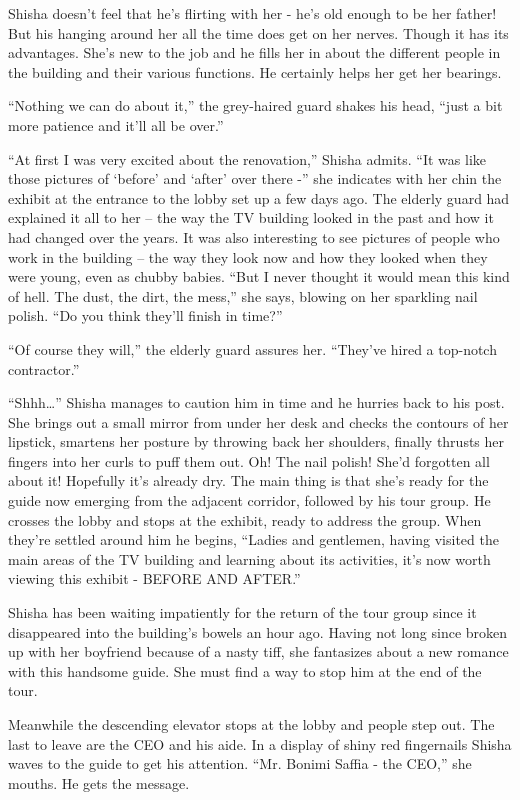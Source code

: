 \documentclass[twoside,11pt]{book}
\begin{document}
Shisha doesn't feel that he's flirting with her - he's old enough to be her father! But his hanging around her all the
time does get on her nerves. Though it has its advantages. She's new to the job and he fills her in
about the different people in the building and their various functions. He certainly helps her get her bearings.

``Nothing we can do about it,'' the grey-haired guard shakes his head, ``just a
bit more patience and it'll all be over.''

``At first I was very excited about the renovation,'' Shisha admits. ``It was
like those pictures of `before' and `after' over there -'' she indicates with her chin the exhibit at the
entrance to the lobby set up a few days ago. The elderly guard had explained it all to her -- the way the TV building
looked in the past and how it had changed over the years. It was also interesting to see pictures of people who work in
the building -- the way they look now and how they looked when they were young, even as chubby babies.
``But I never thought it would mean this kind of hell. The dust, the dirt, the mess,'' she
says, blowing on her sparkling nail polish. ``Do you think they'll finish in time?''

``Of course they will,'' the elderly guard assures her. ``They've hired a
top-notch contractor.''

``Shhh{\dots}'' Shisha manages to caution him in time and he hurries back to his post. She
brings out a small mirror from under her desk and checks the contours of her lipstick, smartens her
posture by throwing back her shoulders, finally thrusts her fingers into her curls to puff them out.
Oh! The nail polish! She'd forgotten all about it! Hopefully it's already dry. The main thing is that she's ready for
the guide now emerging from the adjacent corridor, followed by his tour group. He crosses the lobby and stops at the
exhibit, ready to address the group. When they're settled around him he begins, ``Ladies and gentlemen,
having visited the main areas of the TV building and learning about its activities, it's now worth viewing this exhibit
- BEFORE AND AFTER.''

Shisha has been waiting impatiently for the return of the tour group since it disappeared into the building's bowels an
hour ago. Having not long since broken up with her boyfriend because of a nasty tiff, she fantasizes about a new
romance with this handsome guide. She must find a way to stop him at the end of the tour.

Meanwhile the descending elevator stops at the lobby and people step out. The last to leave are the CEO and his aide. In
a display of shiny red fingernails Shisha waves to the guide to get his attention. ``Mr.  Bonimi Saffia -
the CEO,'' she mouths. He gets the message.
\end{document}
